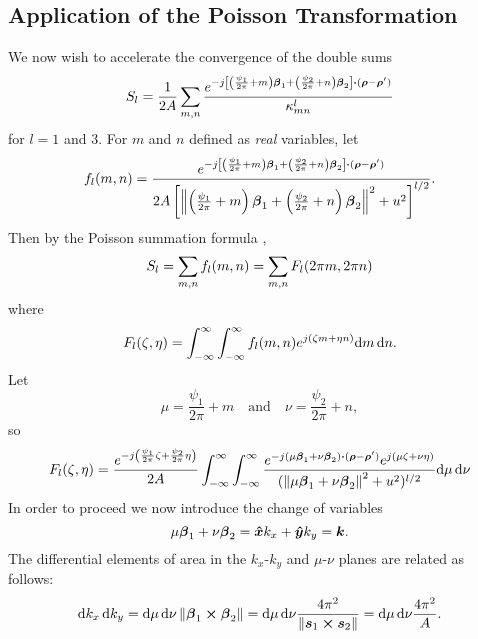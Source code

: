 \subsection{Application of the Poisson Transformation}
We now wish to accelerate the convergence of the double sums 
\begin{equation}
S_l =  \frac{1}{2A}
  \sum_{m,n}
  \frac{e^{-j\left[\left(\frac{\psi_1}
          {2\pi}+m\right)\boldsymbol{\beta}_1+\left(\frac{\psi_2}{2\pi}+n\right)
        \boldsymbol{\beta}_2\right]\boldsymbol{\cdot}(\boldsymbol{\rho}-\boldsymbol{\rho}')}}
  {\kappa_{mn}^{l}}
\end{equation}
for $l=1$ and $3$.
For $m$ and $n$ defined as {\em real\/} variables, let
\begin{equation}
f_l(m,n)  =  \frac{\displaystyle 
  e^{-j\left[\left(\frac{\psi_1}{2\pi}+m\right)\boldsymbol{\beta}_1+\left(\frac{\psi_2}
        {2\pi}+n\right)\boldsymbol{\beta}_2\right]\boldsymbol{\cdot}(\boldsymbol{\rho}-\boldsymbol{\rho}')}} 
{2A\left[\left\lVert\left(\frac{\psi_1}{2\pi}+m\right)\boldsymbol{\beta}_1
      +\left(\frac{\psi_2}{2\pi}+n\right)\boldsymbol{\beta}_2\right\rVert^2+u^2\right]^{l/2}}
.
\end{equation}
Then by the Poisson summation formula \cite[p.~139]{stak:79}, \cite{papo:62}
\begin{equation}
S_l =   \sum_{m,n} f_l(m,n) = \sum_{m,n} F_l(2\pi m,2\pi n)
\end{equation}
where
\begin{equation}
  F_l(\zeta,\eta)  =  \int_{-\infty}^{\infty}\int_{-\infty}^{\infty}
    f_l(m,n)e^{j(\zeta m+\eta n)} \text{d} m\, \text{d} n.
\end{equation}
Let
\begin{equation}
  \mu=\frac{\psi_1}{2\pi}+m \quad \text{and} \quad \nu=\frac{\psi_2}{2\pi}+n,
\end{equation}
so
 \begin{equation}
   F_l(\zeta,\eta)  =  
   \frac{e^{-j\left(\frac{\psi_1}{2\pi}\zeta+\frac{\psi_2}
         {2\pi}\eta\right)}}{2A}
   \int_{-\infty}^{\infty}\int_{-\infty}^{\infty}
   \frac{e^{-j(\mu\boldsymbol{\beta}_1
       +\nu\boldsymbol{\beta}_2)\boldsymbol{\cdot}(\boldsymbol{\rho}-\boldsymbol{\rho}')}e^{j(\mu\zeta+\nu\eta)}}
   {(\left\lVert\mu\boldsymbol{\beta}_1+\nu\boldsymbol{\beta}_2\right\rVert^2+u^2)^{l/2}} 
   \text{d}\mu\,\text{d}\nu 
   \label{eq:Fdef}
 \end{equation}
 In order to proceed
 we now introduce the change of variables 
 \begin{equation}
   \mu\boldsymbol{\beta}_1 + \nu\boldsymbol{\beta}_2 = \boldsymbol{\hat{x}} k_x  + \boldsymbol{\hat{y}} k_y = \boldsymbol{k} .
 \end{equation}
 The differential elements of area in the $k_x$-$k_y$ and 
 $\mu$-$\nu$ planes are related as follows:
 \begin{equation}
   \text{d} k_x \, \text{d} k_y = 
   \text{d} \mu \, \text{d} \nu \left\lVert\boldsymbol{\beta}_1 \boldsymbol{\times} \boldsymbol{\beta}_2\right\rVert = 
   \text{d} \mu \, \text{d} \nu \frac{4\pi^2}{\left\lVert\boldsymbol{s}_1 \boldsymbol{\times} \boldsymbol{s}_2\right\rVert} = 
   \text{d} \mu \, \text{d} \nu \frac{4\pi^2}{A}.
 \end{equation}
